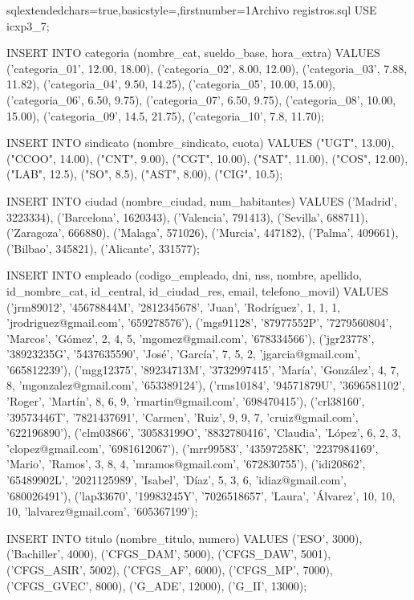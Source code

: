 		\begin{sourcecodep}[]{sql}{extendedchars=true,basicstyle={\fontsize{10}{10}\selectfont\ttfamily},firstnumber=1}{Archivo registros.sql}
		USE icxp3_7;
		
		INSERT INTO categoria (nombre_cat, sueldo_base, hora_extra)
		VALUES 
		('categoria_01', 12.00, 18.00),
		('categoria_02', 8.00, 12.00),
		('categoria_03', 7.88, 11.82),
		('categoria_04', 9.50, 14.25),
		('categoria_05', 10.00, 15.00),
		('categoria_06', 6.50, 9.75),
		('categoria_07', 6.50, 9.75),
		('categoria_08', 10.00, 15.00),
		('categoria_09', 14.5, 21.75),
		('categoria_10', 7.8, 11.70);
		
		INSERT INTO sindicato (nombre_sindicato, cuota)
		VALUES 
		("UGT", 13.00),
		("CCOO", 14.00),
		("CNT", 9.00),
		("CGT", 10.00),
		("SAT", 11.00),
		("COS", 12.00),
		("LAB", 12.5),
		("SO", 8.5),
		("AST", 8.00),
		("CIG", 10.5);
		
		INSERT INTO ciudad (nombre_ciudad, num_habitantes)
		VALUES 
		('Madrid', 3223334),
		('Barcelona', 1620343),
		('Valencia', 791413),
		('Sevilla', 688711),
		('Zaragoza', 666880),
		('Malaga', 571026),
		('Murcia', 447182),
		('Palma', 409661),
		('Bilbao', 345821),
		('Alicante', 331577);
		
		INSERT INTO empleado (codigo_empleado, dni, nss, nombre, apellido, id_nombre_cat, id_central, id_ciudad_res, email, telefono_movil)
		VALUES 
		('jrm89012', '45678844M', '2812345678', 'Juan', 'Rodríguez', 1, 1, 1, 'jrodriguez@gmail.com', '659278576'),
		('mgs91128', '87977552P', '7279560804', 'Marcos', 'Gómez', 2, 4, 5, 'mgomez@gmail.com', '678334566'),
		('jgr23778', '38923235G', '5437635590', 'José', 'García', 7, 5, 2, 'jgarcia@gmail.com', '665812239'),
		('mgg12375', '89234713M', '3732997415', 'María', 'González', 4, 7, 8, 'mgonzalez@gmail.com', '653389124'),
		('rms10184', '94571879U', '3696581102', 'Roger', 'Martín', 8, 6, 9, 'rmartin@gmail.com', '698470415'),
		('crl38160', '39573446T', '7821437691', 'Carmen', 'Ruiz', 9, 9, 7, 'cruiz@gmail.com', '622196890'),
		('clm03866', '30583199O', '8832780416', 'Claudia', 'López', 6, 2, 3, 'clopez@gmail.com', '6981612067'),
		('mrr99583', '43597258K', '2237984169', 'Mario', 'Ramos', 3, 8, 4, 'mramos@gmail.com', '672830755'),
		('idi20862', '65489902L', '2021125989', 'Isabel', 'Díaz', 5, 3, 6, 'idiaz@gmail.com', '680026491'),
		('lap33670', '19983245Y', '7026518657', 'Laura', 'Álvarez', 10, 10, 10, 'lalvarez@gmail.com', '605367199');
		
		INSERT INTO titulo (nombre_titulo, numero)
		VALUES 
		('ESO', 3000),
		('Bachiller', 4000),
		('CFGS_DAM', 5000),
		('CFGS_DAW', 5001),
		('CFGS_ASIR', 5002),
		('CFGS_AF', 6000),
		('CFGS_MP', 7000),
		('CFGS_GVEC', 8000),
		('G_ADE', 12000),
		('G_II', 13000);
		

\end{sourcecodep}

